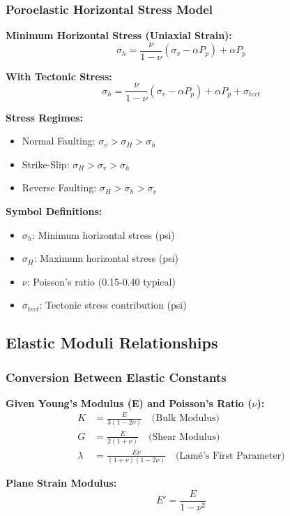 \documentclass[11pt,a4paper]{article}
\newcommand{\symitem}[2]{\item \textbf{#1}: #2}
\begin{document}
\subsubsection{Poroelastic Horizontal Stress Model}

\begin{tcolorbox}[colback=formulabox,colframe=black!75]
\textbf{Minimum Horizontal Stress (Uniaxial Strain):}
\begin{equation}
\sigma_h = \frac{\nu}{1-\nu}(\sigma_v - \alpha P_p) + \alpha P_p
\end{equation}

\textbf{With Tectonic Stress:}
\begin{equation}
\sigma_h = \frac{\nu}{1-\nu}(\sigma_v - \alpha P_p) + \alpha P_p + \sigma_{tect}
\end{equation}

\textbf{Stress Regimes:}
\begin{itemize}
\item Normal Faulting: $\sigma_v > \sigma_H > \sigma_h$
\item Strike-Slip: $\sigma_H > \sigma_v > \sigma_h$
\item Reverse Faulting: $\sigma_H > \sigma_h > \sigma_v$
\end{itemize}
\end{tcolorbox}

\textbf{Symbol Definitions:}
\begin{itemize}[leftmargin=2cm]
\symitem{$\sigma_h$}{Minimum horizontal stress (psi)}
\symitem{$\sigma_H$}{Maximum horizontal stress (psi)}
\symitem{$\nu$}{Poisson's ratio (0.15-0.40 typical)}
\symitem{$\sigma_{tect}$}{Tectonic stress contribution (psi)}
\end{itemize}

\subsection{Elastic Moduli Relationships}

\subsubsection{Conversion Between Elastic Constants}

\begin{tcolorbox}[colback=formulabox,colframe=black!75]
\textbf{Given Young's Modulus (E) and Poisson's Ratio ($\nu$):}
\begin{align}
K &= \frac{E}{3(1-2\nu)} \quad \text{(Bulk Modulus)} \\
G &= \frac{E}{2(1+\nu)} \quad \text{(Shear Modulus)} \\
\lambda &= \frac{E\nu}{(1+\nu)(1-2\nu)} \quad \text{(Lamé's First Parameter)}
\end{align}

\textbf{Plane Strain Modulus:}
\begin{equation}
E' = \frac{E}{1-\nu^2}
\end{equation}
\end{tcolorbox}
\end{document}
